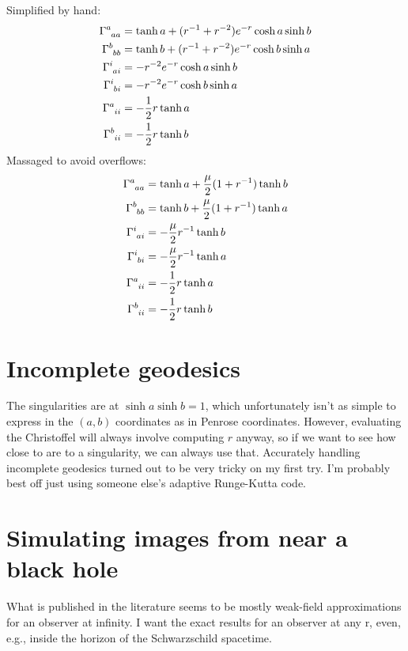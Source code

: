 \documentclass{article}
\begin{document}
Simplified by hand:
\begin{align*}
\Gamma\indices{^a_a_a} &= \tanh a + (r^{-1}+r^{-2})e^{-r}\cosh a\sinh b \\
\Gamma\indices{^b_b_b} &= \tanh b + (r^{-1}+r^{-2})e^{-r}\cosh b\sinh a \\
\Gamma\indices{^i_a_i} &= -r^{-2}e^{-r}\cosh a\sinh b  \\
\Gamma\indices{^i_b_i} &= -r^{-2}e^{-r}\cosh b\sinh a  \\
\Gamma\indices{^a_i_i} &= -\frac{1}{2}r\tanh a\\
\Gamma\indices{^b_i_i} &= -\frac{1}{2}r\tanh b
\end{align*}
Massaged to avoid overflows:
\begin{align*}
\Gamma\indices{^a_a_a} &= \tanh a + \frac{\mu}{2}(1+r^{-1})\tanh b \\
\Gamma\indices{^b_b_b} &= \tanh b + \frac{\mu}{2}(1+r^{-1})\tanh a \\
\Gamma\indices{^i_a_i} &= -\frac{\mu}{2}r^{-1}\tanh b  \\
\Gamma\indices{^i_b_i} &= -\frac{\mu}{2}r^{-1}\tanh a  \\
\Gamma\indices{^a_i_i} &= -\frac{1}{2}r\tanh a\\
\Gamma\indices{^b_i_i} &= -\frac{1}{2}r\tanh b
\end{align*}

\section{Incomplete geodesics}
The singularities are at $\sinh a\sinh b=1$, which unfortunately isn't as simple to express in the
$(a,b)$ coordinates as in Penrose coordinates. However, evaluating the Christoffel will always
involve computing $r$ anyway, so if we want to see how close to are to a singularity, we can always
use that. Accurately handling incomplete geodesics turned out to be very tricky on my first try.
I'm probably best off just using someone else's adaptive Runge-Kutta code.

\section{Simulating images from near a black hole}

What is published in the literature seems to be mostly weak-field approximations for an observer
at infinity. I want the exact results for an observer at any r, even, e.g., inside the horizon of
the Schwarzschild spacetime.
\end{document}
